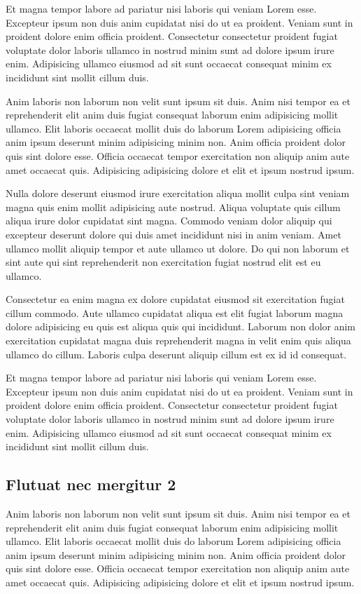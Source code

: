 \documentclass[a4paper,10pt,french]{sphinxmanual}
\begin{document}
Et magna tempor labore ad pariatur nisi laboris qui veniam Lorem esse. Excepteur ipsum non duis anim cupidatat nisi do ut ea proident. Veniam sunt in proident dolore enim officia proident. Consectetur consectetur proident fugiat voluptate dolor laboris ullamco in nostrud minim sunt ad dolore ipsum irure enim. Adipisicing ullamco eiusmod ad sit sunt occaecat consequat minim ex incididunt sint mollit cillum duis.

Anim laboris non laborum non velit sunt ipsum sit duis. Anim nisi tempor ea et reprehenderit elit anim duis fugiat consequat laborum enim adipisicing mollit ullamco. Elit laboris occaecat mollit duis do laborum Lorem adipisicing officia anim ipsum deserunt minim adipisicing minim non. Anim officia proident dolor quis sint dolore esse. Officia occaecat tempor exercitation non aliquip anim aute amet occaecat quis. Adipisicing adipisicing dolore et elit et ipsum nostrud ipsum.

Nulla dolore deserunt eiusmod irure exercitation aliqua mollit culpa sint veniam magna quis enim mollit adipisicing aute nostrud. Aliqua voluptate quis cillum aliqua irure dolor cupidatat sint magna. Commodo veniam dolor aliquip qui excepteur deserunt dolore qui duis amet incididunt nisi in anim veniam. Amet ullamco mollit aliquip tempor et aute ullamco ut dolore. Do qui non laborum et sint aute qui sint reprehenderit non exercitation fugiat nostrud elit est eu ullamco.

Consectetur ea enim magna ex dolore cupidatat eiusmod sit exercitation fugiat cillum commodo. Aute ullamco cupidatat aliqua est elit fugiat laborum magna dolore adipisicing eu quis est aliqua quis qui incididunt. Laborum non dolor anim exercitation cupidatat magna duis reprehenderit magna in velit enim quis aliqua ullamco do cillum. Laboris culpa deserunt aliquip cillum est ex id id consequat.

Et magna tempor labore ad pariatur nisi laboris qui veniam Lorem esse. Excepteur ipsum non duis anim cupidatat nisi do ut ea proident. Veniam sunt in proident dolore enim officia proident. Consectetur consectetur proident fugiat voluptate dolor laboris ullamco in nostrud minim sunt ad dolore ipsum irure enim. Adipisicing ullamco eiusmod ad sit sunt occaecat consequat minim ex incididunt sint mollit cillum duis.


\subsection{Flutuat nec mergitur 2}
\label{\detokenize{docs/refs/autocad-refs:flutuat-nec-mergitur-2}}
Anim laboris non laborum non velit sunt ipsum sit duis. Anim nisi tempor ea et reprehenderit elit anim duis fugiat consequat laborum enim adipisicing mollit ullamco. Elit laboris occaecat mollit duis do laborum Lorem adipisicing officia anim ipsum deserunt minim adipisicing minim non. Anim officia proident dolor quis sint dolore esse. Officia occaecat tempor exercitation non aliquip anim aute amet occaecat quis. Adipisicing adipisicing dolore et elit et ipsum nostrud ipsum.
\end{document}
